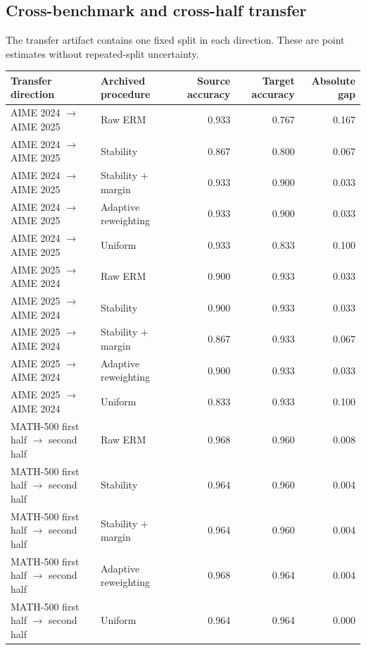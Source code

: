 \subsection{Cross-benchmark and cross-half transfer}

The transfer artifact contains one fixed split in each direction. These are point estimates without repeated-split uncertainty.

\begin{table}[p]
\centering
\scriptsize
\setlength{\tabcolsep}{5pt}
\begin{tabular}{llrrr}
\toprule
Transfer direction & Archived procedure & Source accuracy & Target accuracy & Absolute gap \\
\midrule
AIME 2024 \(\rightarrow\) AIME 2025 & Raw ERM & 0.933 & 0.767 & 0.167 \\
AIME 2024 \(\rightarrow\) AIME 2025 & Stability & 0.867 & 0.800 & 0.067 \\
AIME 2024 \(\rightarrow\) AIME 2025 & Stability \(+\) margin & 0.933 & 0.900 & 0.033 \\
AIME 2024 \(\rightarrow\) AIME 2025 & Adaptive reweighting & 0.933 & 0.900 & 0.033 \\
AIME 2024 \(\rightarrow\) AIME 2025 & Uniform & 0.933 & 0.833 & 0.100 \\
\midrule
AIME 2025 \(\rightarrow\) AIME 2024 & Raw ERM & 0.900 & 0.933 & 0.033 \\
AIME 2025 \(\rightarrow\) AIME 2024 & Stability & 0.900 & 0.933 & 0.033 \\
AIME 2025 \(\rightarrow\) AIME 2024 & Stability \(+\) margin & 0.867 & 0.933 & 0.067 \\
AIME 2025 \(\rightarrow\) AIME 2024 & Adaptive reweighting & 0.900 & 0.933 & 0.033 \\
AIME 2025 \(\rightarrow\) AIME 2024 & Uniform & 0.833 & 0.933 & 0.100 \\
\midrule
MATH-500 first half \(\rightarrow\) second half & Raw ERM & 0.968 & 0.960 & 0.008 \\
MATH-500 first half \(\rightarrow\) second half & Stability & 0.964 & 0.960 & 0.004 \\
MATH-500 first half \(\rightarrow\) second half & Stability \(+\) margin & 0.964 & 0.960 & 0.004 \\
MATH-500 first half \(\rightarrow\) second half & Adaptive reweighting & 0.968 & 0.964 & 0.004 \\
MATH-500 first half \(\rightarrow\) second half & Uniform & 0.964 & 0.964 & 0.000 \\

\end{tabular}
\end{table}
